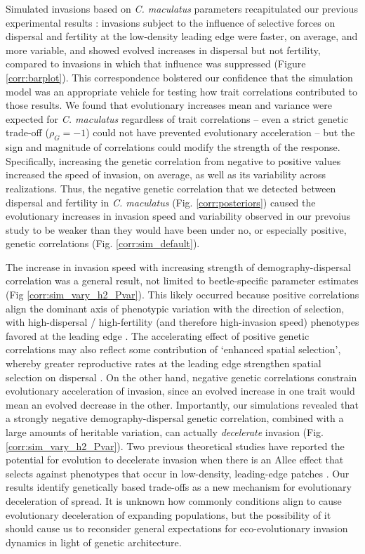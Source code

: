 \documentclass[11pt]{article}
\begin{document}
Simulated invasions based on \textit{C. maculatus} parameters recapitulated our previous experimental results \citep{ochocki_rapid_2017}: invasions subject to the influence of selective forces on dispersal and fertility at the low-density leading edge were faster, on average, and more variable, and showed evolved increases in dispersal but not fertility, compared to invasions in which that influence was suppressed (Figure \ref{corr:barplot}).
This correspondence bolstered our confidence that the simulation model was an appropriate vehicle for testing how trait correlations contributed to those results.
We found that evolutionary increases mean and variance were expected for \textit{C. maculatus} regardless of trait correlations -- even a strict genetic trade-off ($\rho_{G} = -1$) could not have prevented evolutionary acceleration -- but the sign and magnitude of correlations could modify the strength of the response.
Specifically, increasing the genetic correlation from negative to positive values increased the speed of invasion, on average, as well as its variability across realizations.
Thus, the negative genetic correlation that we detected between dispersal and fertility in \textit{C. maculatus} (Fig. \ref{corr:posteriors}) caused the evolutionary increases in invasion speed and variability observed in our prevoius study to be weaker than they would have been under no, or especially positive, genetic correlations (Fig. \ref{corr:sim_default}).

The increase in invasion speed with increasing strength of demography-dispersal correlation was a general result, not limited to beetle-specific parameter estimates (Fig \ref{corr:sim_vary_h2_Pvar}).
This likely occurred because positive correlations align the dominant axis of phenotypic variation with the direction of selection, with high-dispersal / high-fertility (and therefore high-invasion speed) phenotypes favored at the leading edge \citep{phillips_life-history_2010}.
The accelerating effect of positive genetic correlations may also reflect some contribution of `enhanced spatial selection', whereby greater reproductive rates at the leading edge strengthen spatial selection on dispersal \citep{perkins_evolution_2013}.
On the other hand, negative genetic correlations constrain evolutionary acceleration of invasion, since an evolved increase in one trait would mean an evolved decrease in the other.
Importantly, our simulations revealed that a strongly negative demography-dispersal genetic correlation, combined with a large amounts of heritable variation, can actually \textit{decelerate} invasion (Fig. \ref{corr:sim_vary_h2_Pvar}). 
Two previous theoretical studies have reported the potential for evolution to decelerate invasion when there is an Allee effect that selects against phenotypes that occur in low-density, leading-edge patches \citep{shaw_dispersal_2015, travis_dispersal_2002}.
Our results identify genetically based trade-offs as a new mechanism for evolutionary deceleration of spread.
It is unknown how commonly conditions align to cause evolutionary deceleration of expanding populations, but the possibility of it should cause us to reconsider general expectations for eco-evolutionary invasion dynamics in light of genetic architecture.
\end{document}
